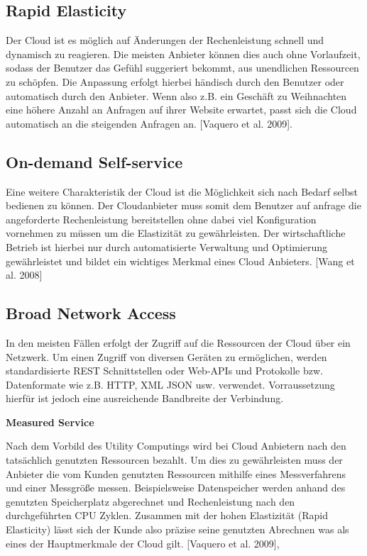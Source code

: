 \subsection{Rapid Elasticity}
Der Cloud ist es möglich auf Änderungen der Rechenleistung schnell und dynamisch zu reagieren. Die meisten Anbieter können dies auch ohne Vorlaufzeit, sodass der Benutzer das Gefühl suggeriert bekommt, aus unendlichen Ressourcen zu schöpfen. Die Anpassung erfolgt hierbei händisch durch den Benutzer oder automatisch durch den Anbieter. Wenn also z.B. ein Geschäft zu Weihnachten eine höhere Anzahl an Anfragen auf ihrer Website erwartet, passt sich die Cloud automatisch an die steigenden Anfragen an. 
[Vaquero et al. 2009].
\subsection{On-demand Self-service}
Eine weitere Charakteristik der Cloud ist die Möglichkeit sich nach Bedarf selbst bedienen  zu können. Der Cloudanbieter muss somit dem Benutzer auf anfrage die angeforderte Rechenleistung bereitstellen ohne dabei viel Konfiguration vornehmen zu müssen um die Elastizität zu gewährleisten. Der wirtschaftliche Betrieb ist hierbei nur durch automatisierte Verwaltung und Optimierung gewährleistet und bildet ein wichtiges Merkmal eines Cloud Anbieters.
[Wang et al. 2008]
\subsection{Broad Network Access}
In den meisten Fällen erfolgt der Zugriff auf die Ressourcen der Cloud über ein Netzwerk. Um einen Zugriff von diversen Geräten zu ermöglichen, werden standardisierte REST Schnittstellen oder Web-APIs und Protokolle bzw. Datenformate wie z.B. HTTP, XML JSON usw. verwendet. Vorraussetzung hierfür ist jedoch eine ausreichende Bandbreite der Verbindung.

\textbf{Measured Service}

Nach dem Vorbild des Utility Computings wird bei Cloud Anbietern nach den tatsächlich genutzten Ressourcen bezahlt. Um dies zu gewährleisten muss der Anbieter die vom Kunden genutzten Ressourcen mithilfe eines Messverfahrens und einer Messgröße messen. Beispielsweise Datenspeicher werden anhand des genutzten Speicherplatz abgerechnet und Rechenleistung nach den durchgeführten CPU Zyklen. Zusammen mit der hohen Elastizität (Rapid Elasticity) lässt sich der Kunde also präzise seine  genutzten Abrechnen was als eines der Hauptmerkmale der Cloud gilt.
[Vaquero et al. 2009],

